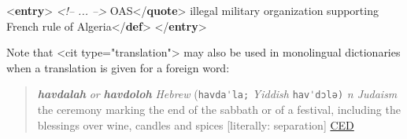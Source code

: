  \par\bgroup{}\exampleFont \begin{shaded}\noindent\mbox{}{<\textbf{entry}>}\mbox{}\newline 
\textit{<!-- ... -->}\mbox{}\newline 
{}\mbox{}\newline 
\hspace*{1em}OAS{</\textbf{quote}>}\mbox{}\newline 
\hspace*{1em}illegal military organization supporting French rule of\mbox{}\newline 
\hspace*{1em}\hspace*{1em}\hspace*{1em}\hspace*{1em} Algeria{</\textbf{def}>}\mbox{}\newline 
{}\mbox{}\newline 
{</\textbf{entry}>}\end{shaded}\egroup\par \par
Note that <cit type="translation"> may also be used in monolingual dictionaries when a translation is given for a foreign word: 
\begin{quote}{\itshape\bfseries havdalah} {\itshape or} {\itshape\bfseries havdoloh} {\itshape Hebrew} (\texttt{havdaˈla;} {\itshape Yiddish} \texttt{havˈdɔlə)} {\itshape n Judaism} the ceremony marking the end of the sabbath or of a festival, including the blessings over wine, candles and spices [literally: separation] \hyperref[DIC-CED]{CED}\end{quote}
